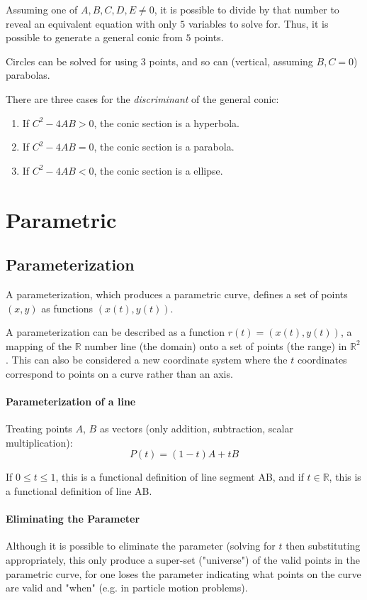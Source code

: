 \documentclass{article}
\begin{document}
Assuming one of $A, B, C, D, E \ne 0$, it is possible to divide by that number to reveal an equivalent equation with only $5$ variables to solve for. Thus, it is possible to generate a general conic from $5$ points.

Circles can be solved for using $3$ points, and so can (vertical, assuming $B, C = 0$) parabolas.

There are three cases for the \emph{discriminant} of the general conic:
\begin{enumerate}
    \item If $C^2 - 4AB > 0$, the conic section is a hyperbola.
    \item If $C^2 - 4AB = 0$, the conic section is a parabola.
    \item If $C^2 - 4AB < 0$, the conic section is a ellipse.
\end{enumerate}

\section{Parametric}
\subsection{Parameterization}
A parameterization, which produces a parametric curve, defines a set of points $(x, y)$ as functions $(x(t), y(t))$.

A parameterization can be described as a function $r(t) = (x(t), y(t))$, a mapping of the $\mathbb{R}$ number line (the domain) onto a set of points (the range) in $\mathbb{R}^2$. This can also be considered a new coordinate system where the $t$ coordinates correspond to points on a curve rather than an axis.


\paragraph{Parameterization of a line}
Treating points $A$, $B$ as vectors (only addition, subtraction, scalar multiplication):
$$P(t) = (1-t)A + tB$$

If $0 \le t \le 1$, this is a functional definition of line segment AB, and if $t \in \mathbb{R}$, this is a functional definition of line AB.

\paragraph{Eliminating the Parameter}
Although it is possible to eliminate the parameter (solving for $t$ then substituting appropriately, this only produce a super-set ("universe") of the valid points in the parametric curve, for one loses the parameter indicating what points on the curve are valid and "when" (e.g. in particle motion problems).
\end{document}
